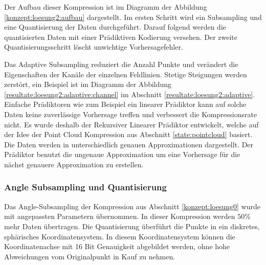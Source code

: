 Der Aufbau dieser Kompression ist im Diagramm der Abbildung \ref{konzept:loesung2:aufbau} dargestellt. Im ersten Schritt wird ein Subsampling und eine Quantisierung der Daten durchgeführt. Darauf folgend werden die quantisierten Daten mit einer Prädiktiven Kodierung versehen. Der zweite Quantisierungsschritt löscht unwichtige Vorhersagefehler. 

Das Adaptive Subsampling reduziert die Anzahl Punkte und verändert die Eigenschaften der Kanäle der einzelnen Feldlinien. Stetige Steigungen werden zerstört, ein Beispiel ist im Diagramm der Abbildung \ref{resultate:loesung2:adaptive:channel} im Abschnitt \ref{resultate:loesung2:adaptive}. Einfache Prädiktoren wie zum Beispiel ein linearer Prädiktor kann auf solche Daten keine zuverlässige Vorhersage treffen und verbessert die Kompressionsrate nicht. Es wurde deshalb der Rekursiver Linearer Prädiktor entwickelt, welche auf der Idee der Point Cloud Kompression aus Abschnitt \ref{state:pointcloud} basiert. Die Daten werden in unterschiedlich genauen Approximationen dargestellt. Der Prädiktor benutzt die ungenaue Approximation um eine Vorhersage für die nächst genauere Approximation zu erstellen.

\subsubsection{Angle Subsampling und Quantisierung}
Das Angle-Subsampling der Kompression aus Abschnitt \ref{konzept:loesung0} wurde mit angepassten Parametern übernommen. In dieser Kompression werden $50\%$ mehr Daten übertragen. Die Quantisierung überführt die Punkte in ein diskretes, sphärisches Koordinatensystem. In diesem Koordinatensystem können die Koordinatenachse mit 16 Bit Genauigkeit abgebildet werden, ohne hohe Abweichungen vom Originalpunkt in Kauf zu nehmen.

